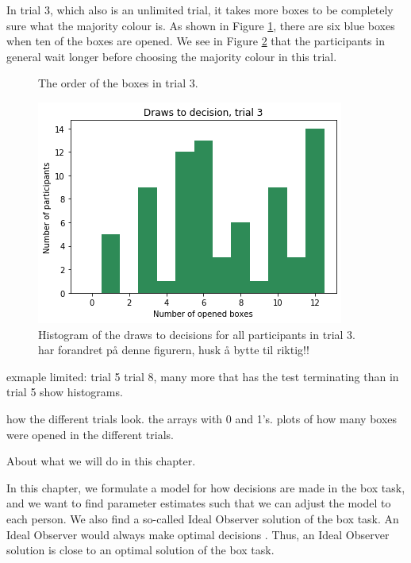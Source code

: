 In trial 3, which also is an unlimited trial, it takes more boxes to be completely sure what the majority colour is. As shown in Figure \ref{fig:trial3_order}, there are six blue boxes when ten of the boxes are opened. We see in Figure \ref{fig:histogram_trial3} that the participants in general wait longer before choosing the majority colour in this trial.

\begin{figure}
    \centering
    \scalebox{0.8}{}
    \caption[Order of boxes in trial 3]{The order of the boxes in trial 3.}
    \label{fig:trial3_order}
\end{figure}

\begin{figure}
    \centering
    \includegraphics[scale=0.6]{pictures/dtd3_histogram2.png}
    \caption[Draws to decisions trial 3]{Histogram of the draws to decisions for all participants in trial 3. 
    har forandret på denne figurern, husk å bytte til riktig!!}
    \label{fig:histogram_trial3}
\end{figure}



exmaple limited:
trial 5 
trial 8, many more that has the test terminating than in trial 5
show histograms. 



how the different trials look. the arrays with 0 and 1's. 
plots of how many boxes were opened in the different trials. 




About what we will do in this chapter. 

In this chapter, we formulate a model for how decisions are made in the box task, and we want to find parameter estimates such that we can adjust the model to each person. We also find a so-called Ideal Observer solution of the box task. An Ideal Observer would always make optimal decisions \citep{idealObs}. Thus, an Ideal Observer solution is close to an optimal solution of the box task. 



